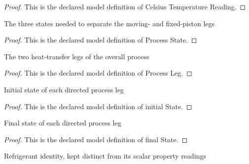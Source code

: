 \begin{proof}
  This is the declared model definition of Celsius Temperature Reading.
\end{proof}
\begin{definition}
  \label{def:physics:phyx-mini-0464:phyxminiproblems-problemphyxmini0464-processstate}
  The three states needed to separate the moving- and fixed-piston legs
\end{definition}
\begin{proof}
  This is the declared model definition of Process State.
\end{proof}
\begin{definition}
  \label{def:physics:phyx-mini-0464:phyxminiproblems-problemphyxmini0464-processleg}
  The two heat-transfer legs of the overall process
\end{definition}
\begin{proof}
  This is the declared model definition of Process Leg.
\end{proof}
\begin{definition}
  \label{def:physics:phyx-mini-0464:phyxminiproblems-problemphyxmini0464-processleg-initialstate}
  Initial state of each directed process leg
\end{definition}
\begin{proof}
  This is the declared model definition of initial State.
\end{proof}
\begin{definition}
  \label{def:physics:phyx-mini-0464:phyxminiproblems-problemphyxmini0464-processleg-finalstate}
  Final state of each directed process leg
\end{definition}
\begin{proof}
  This is the declared model definition of final State.
\end{proof}
\begin{definition}
  \label{def:physics:phyx-mini-0464:phyxminiproblems-problemphyxmini0464-refrigerantkind}
  Refrigerant identity, kept distinct from its scalar property readings
\end{definition}
